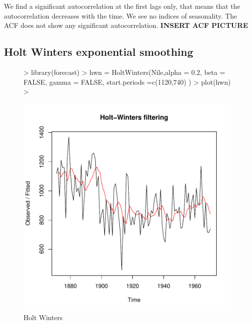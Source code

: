 \documentclass[10pt, a4paper]{article} %
\begin{document}
\noindent We find a significant autocorrelation at the first lags only, that means that the autocorrelation decreases with the time. We see no indices of seasonality. 
The ACF does not show any significant autocorrelation. \textbf{INSERT ACF PICTURE}


\subsection{Holt Winters exponential smoothing}

\begin{figure}[H]
\centering
\begin{Schunk}
\begin{Sinput}
> library(forecast)
> hwn = HoltWinters(Nile,alpha = 0.2, beta = FALSE, gamma = FALSE,
                   start.periods =c(1120,740) )
> plot(hwn)
> 
\end{Sinput}
\end{Schunk}
\includegraphics{FINAL_VERSION-093}
\caption{Holt Winters}
\end{figure}
\end{document}
